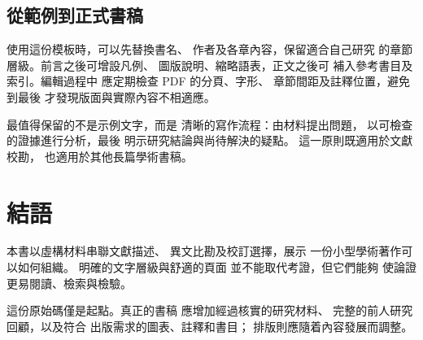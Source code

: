 \documentclass[lang=zh]{impebook}
\begin{document}
\section{從範例到正式書稿}
使用這份模板時，可以先替換書名、
作者及各章內容，保留適合自己研究
的章節層級。前言之後可增設凡例、
圖版說明、縮略語表，正文之後可
補入參考書目及索引。編輯過程中
應定期檢查 PDF 的分頁、字形、
章節間距及註釋位置，避免到最後
才發現版面與實際內容不相適應。

最值得保留的不是示例文字，而是
清晰的寫作流程：由材料提出問題，
以可檢查的證據進行分析，最後
明示研究結論與尚待解決的疑點。
這一原則既適用於文獻校勘，
也適用於其他長篇學術書稿。

\backmatter
\chapter*{結語}
本書以虛構材料串聯文獻描述、
異文比勘及校訂選擇，展示
一份小型學術著作可以如何組織。
明確的文字層級與舒適的頁面
並不能取代考證，但它們能夠
使論證更易閱讀、檢索與檢驗。

這份原始碼僅是起點。真正的書稿
應增加經過核實的研究材料、
完整的前人研究回顧，以及符合
出版需求的圖表、註釋和書目；
排版則應隨着內容發展而調整。
\end{document}
